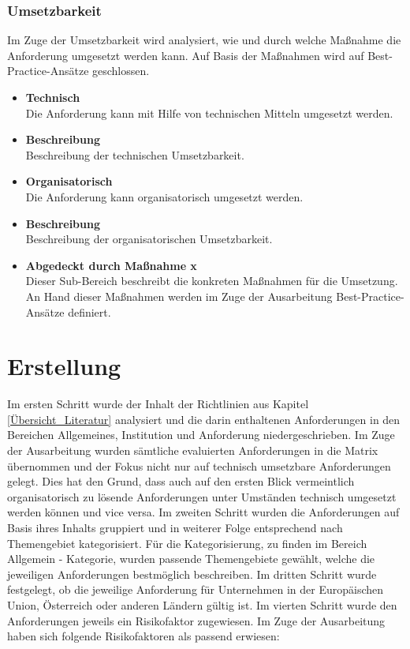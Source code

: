 \subsubsection{Umsetzbarkeit} \label{umsetzbarkeit_maßnahme}
Im Zuge der Umsetzbarkeit wird analysiert, wie und durch welche Maßnahme die Anforderung umgesetzt werden kann. Auf Basis der Maßnahmen wird auf Best-Practice-Ansätze geschlossen. 
\begin{itemize}
    \item \textbf{Technisch}\\
    Die Anforderung kann mit Hilfe von technischen Mitteln umgesetzt werden. 
    \item \textbf{Beschreibung}\\
    Beschreibung der technischen Umsetzbarkeit.
    \item \textbf{Organisatorisch}\\
    Die Anforderung kann organisatorisch umgesetzt werden.
    \item \textbf{Beschreibung}\\
    Beschreibung der organisatorischen Umsetzbarkeit.
    \item \textbf{Abgedeckt durch Maßnahme x}\\
    Dieser Sub-Bereich beschreibt die konkreten Maßnahmen für die Umsetzung. An Hand dieser Maßnahmen werden im Zuge der Ausarbeitung Best-Practice-Ansätze definiert.
\end{itemize}
\bigbreak

\section{Erstellung}\label{Auswertung_der_Anforderungsmatrix_Vorgehen}
Im ersten Schritt wurde der Inhalt der Richtlinien aus Kapitel \ref{Übersicht_Literatur} analysiert und die darin enthaltenen Anforderungen in den Bereichen \glqq{}Allgemeines\grqq{}, \glqq{}Institution\grqq{} und \glqq{}Anforderung\grqq{} niedergeschrieben. Im Zuge der Ausarbeitung wurden sämtliche evaluierten Anforderungen in die Matrix übernommen und der Fokus nicht nur auf technisch umsetzbare Anforderungen gelegt. Dies hat den Grund, dass auch auf den ersten Blick vermeintlich organisatorisch zu lösende Anforderungen unter Umständen technisch umgesetzt werden können und vice versa.
\bigbreak
Im zweiten Schritt wurden die Anforderungen auf Basis ihres Inhalts gruppiert und in weiterer Folge entsprechend nach Themengebiet kategorisiert. Für die Kategorisierung, zu finden im Bereich \glqq{}Allgemein\grqq{} - \glqq{}Kategorie\grqq{ }, wurden passende Themengebiete gewählt, welche die jeweiligen Anforderungen bestmöglich beschreiben.
\bigbreak
Im dritten Schritt wurde festgelegt, ob die jeweilige Anforderung für Unternehmen in der Europäischen Union, Österreich oder anderen Ländern gültig ist.
\bigbreak
Im vierten Schritt wurde den Anforderungen jeweils ein Risikofaktor zugewiesen. 
Im Zuge der Ausarbeitung haben sich folgende Risikofaktoren als passend erwiesen:

